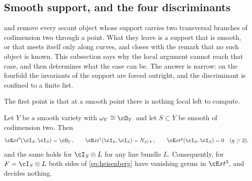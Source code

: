 \subsection{Smooth support, and the four discriminants}
\label{ssec:smoothsupport}

 and  remove every secant
object whose support carries two transversal branches of codimension two
through a point. What they leave is a support that is smooth, or that meets
itself only along curves, and  closes with the
remark that no such object is known. This subsection says why the local
argument cannot reach that case, and then determines what the case can be.
The answer is narrow: on the fourfold the invariants of the support are
forced outright, and the discriminant is confined to a finite list.

The first point is that at a smooth point there is nothing local left to
compute.

\begin{proposition}\label{prop:smoothlocal}
Let $Y$ be a smooth variety with $\omega_{Y}\cong\cO_{Y}$ and let $S\subset Y$
be smooth of codimension two. Then
\[
  \cE xt^{0}(\cI_{S},\cI_{S})=\cO_{Y},\qquad
  \cE xt^{1}(\cI_{S},\cI_{S})=N_{S/Y},\qquad
  \cE xt^{q}(\cI_{S},\cI_{S})=0\quad(q\ge2),
\]
and the same holds for $\cI_{S}\otimes L$ for any line bundle $L$.
Consequently, for $F=\cI_{S}\otimes L$ both sides of \eqref{eq:heisenberg}
have vanishing germs in $\cE xt^{2}$, and  decides nothing.
\end{proposition}

